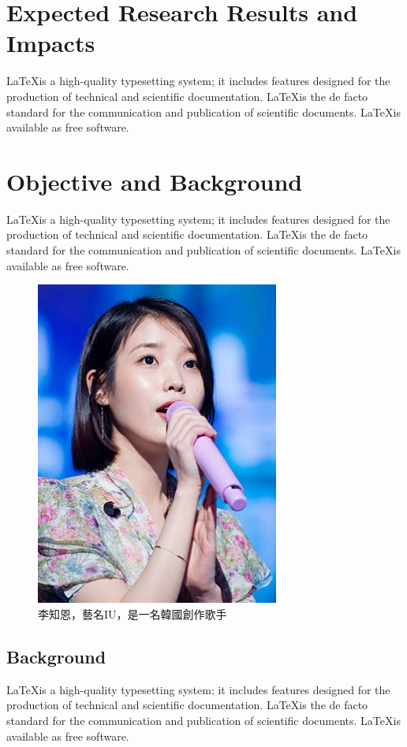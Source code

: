 \documentclass[12pt,a4paper]{article}
\begin{document}
\newpage
\section{Expected Research Results and Impacts}
\label{sec:expected_impacts}

\LaTeX is a high-quality typesetting system; it includes features designed for the production of technical and scientific documentation. \LaTeX is the de facto standard for the communication and publication of scientific documents. \LaTeX is available as free software.


\newpage
\section{Objective and Background}
\label{sec:objective}
\LaTeX is a high-quality typesetting system; it includes features designed for the production of technical and scientific documentation. \LaTeX is the de facto standard for the communication and publication of scientific documents. \LaTeX is available as free software.

\begin{figure}[t]
  \centering
  \centerline{\includegraphics[width=8cm]{IU.jpg}}
  \caption{李知恩，藝名IU，是一名韓國創作歌手}
  \label{fig:fig1}
\end{figure}

\subsection{Background}
\label{sec:relatedwork}
\LaTeX is a high-quality typesetting system; it includes features designed for the production of technical and scientific documentation. \LaTeX is the de facto standard for the communication and publication of scientific documents. \LaTeX is available as free software.
\end{document}
